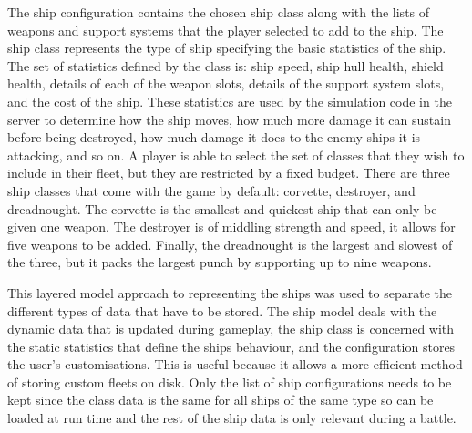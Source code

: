 The ship configuration contains the chosen ship class along with the lists of weapons and support systems that the player selected to add to the ship. The ship class represents the type of ship specifying the basic statistics of the ship. The set of statistics defined by the class is: ship speed, ship hull health, shield health, details of each of the weapon slots, details of the support system slots, and the cost of the ship. These statistics are used by the simulation code in the server to determine how the ship moves, how much more damage it can sustain before being destroyed, how much damage it does to the enemy ships it is attacking, and so on. A player is able to select the set of classes that they wish to include in their fleet, but they are restricted by a fixed budget. There are three ship classes that come with the game by default: corvette, destroyer, and dreadnought. The corvette is the smallest and quickest ship that can only be given one weapon. The destroyer is of middling strength and speed, it allows for five weapons to be added. Finally, the dreadnought is the largest and slowest of the three, but it packs the largest punch by supporting up to nine weapons.

This layered model approach to representing the ships was used to separate the different types of data that have to be stored. The ship model deals with the dynamic data that is updated during gameplay, the ship class is concerned with the static statistics that define the ships behaviour, and the configuration stores the user's customisations. This is useful because it allows a more efficient method of storing custom fleets on disk. Only the list of ship configurations needs to be kept since the class data is the same for all ships of the same type so can be loaded at run time and the rest of the ship data is only relevant during a battle.

